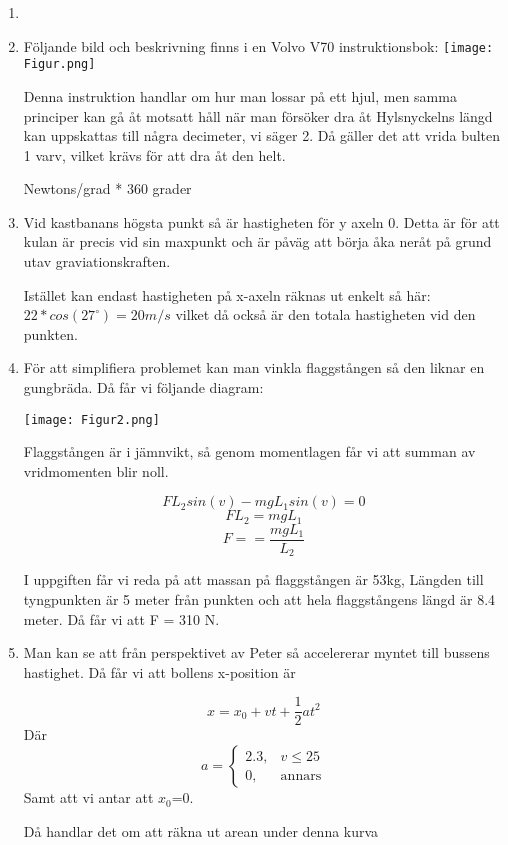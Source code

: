 \documentclass[a4paper,12pt]{article}
\begin{document}
\begin{enumerate}
   \item 

   \item 
   Följande bild och beskrivning finns i en Volvo V70 instruktionsbok:
   \texttt{[image: Figur.png]}

    Denna instruktion handlar om hur man lossar på ett hjul, men samma principer
    kan gå åt motsatt håll när man försöker dra åt 
    Hylsnyckelns längd kan uppskattas till några decimeter, vi säger 2. Då gäller det att vrida
    bulten 1 varv, vilket krävs för att dra åt den helt. 

    Newtons/grad * 360 grader 


    \item 
    Vid kastbanans högsta punkt så är hastigheten för y axeln 0. Detta är för att
    kulan är precis vid sin maxpunkt och är påväg att börja åka neråt på grund utav
    graviationskraften.

    Istället kan endast hastigheten på x-axeln räknas ut enkelt så här:
    $22*cos(27^\circ)=20 m/s$ vilket då också är den totala hastigheten vid den punkten.

    \item 
    För att simplifiera problemet kan man vinkla flaggstången så den liknar
    en gungbräda. Då får vi följande diagram:
    
    \texttt{[image: Figur2.png]}
    
    Flaggstången är i jämnvikt, så genom momentlagen får vi att summan av vridmomenten
    blir noll.

    $$FL_2sin(v)-mgL_1sin(v)=0$$
    $$FL_2=mgL_1$$
    $$F==\frac{mgL_1}{L_2}$$

    I uppgiften får vi reda på att massan på flaggstången är 53kg, Längden till 
    tyngpunkten är 5 meter från punkten och att hela flaggstångens längd
    är 8.4 meter. Då får vi att F = 310 N.

    \item 

    Man kan se att från perspektivet av Peter så accelererar myntet
    till bussens hastighet. Då får vi att bollens x-position är

    $$x=x_0+vt+\frac{1}{2}at^2$$
    Där \[ a =
     \begin{cases}
        2.3, & v \leq 25 \\
        0, & \text{annars}
    \end{cases}
    \] 
    Samt att vi antar att $x_0$=0.

    Då handlar det om att räkna ut arean under denna kurva
    
\end{enumerate}
\end{document}

